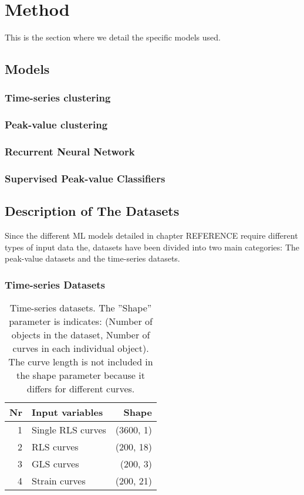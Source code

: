 \chapter{Method}

This is the section where we detail the specific models used. \bigskip

\section{Models} 

\subsection{Time-series clustering}

\subsection{Peak-value clustering}

\subsection{Recurrent Neural Network}

\subsection{Supervised Peak-value Classifiers}

\section{Description of The Datasets}

Since the different ML models detailed in chapter REFERENCE require different types of input data the, datasets have been divided into two main categories: 
The peak-value datasets and the time-series datasets. \bigskip

\subsection{Time-series Datasets}

\begin{table*}[h]
    \centering
    \begin{tabular}{ rlr }
        \toprule
        Nr & Input variables   & Shape \\
        \midrule
        1  & Single RLS curves & (3600, 1) \\
        2  & RLS curves        & (200, 18) \\
        3  & GLS curves        & (200, 3)  \\
        4  & Strain curves     & (200, 21) \\
        \bottomrule
    \end{tabular}
    \caption{Time-series datasets. The ''Shape'' parameter is indicates: (Number of objects in the dataset, Number of curves in each individual object). The curve length is not included in the shape parameter because it differs for different curves.}
    \label{tab:ts_dsets}
\end{table*}

